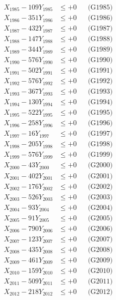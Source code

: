 \documentclass[a4paper,10pt]{article}
\begin{document}
{\begin{align}
X_{1985} - 109Y_{1985} &\leq +0 && \text{(G1985)} \\
X_{1986} - 351Y_{1986} &\leq +0 && \text{(G1986)} \\
X_{1987} - 432Y_{1987} &\leq +0 && \text{(G1987)} \\
X_{1988} - 147Y_{1988} &\leq +0 && \text{(G1988)} \\
X_{1989} - 344Y_{1989} &\leq +0 && \text{(G1989)} \\
X_{1990} - 576Y_{1990} &\leq +0 && \text{(G1990)} \\
\allowbreak
X_{1991} - 502Y_{1991} &\leq +0 && \text{(G1991)} \\
X_{1992} - 576Y_{1992} &\leq +0 && \text{(G1992)} \\
X_{1993} - 367Y_{1993} &\leq +0 && \text{(G1993)} \\
X_{1994} - 130Y_{1994} &\leq +0 && \text{(G1994)} \\
X_{1995} - 522Y_{1995} &\leq +0 && \text{(G1995)} \\
X_{1996} - 258Y_{1996} &\leq +0 && \text{(G1996)} \\
X_{1997} - 16Y_{1997} &\leq +0 && \text{(G1997)} \\
X_{1998} - 205Y_{1998} &\leq +0 && \text{(G1998)} \\
X_{1999} - 576Y_{1999} &\leq +0 && \text{(G1999)} \\
X_{2000} - 43Y_{2000} &\leq +0 && \text{(G2000)} \\
\allowbreak
X_{2001} - 402Y_{2001} &\leq +0 && \text{(G2001)} \\
X_{2002} - 176Y_{2002} &\leq +0 && \text{(G2002)} \\
X_{2003} - 526Y_{2003} &\leq +0 && \text{(G2003)} \\
X_{2004} - 93Y_{2004} &\leq +0 && \text{(G2004)} \\
X_{2005} - 91Y_{2005} &\leq +0 && \text{(G2005)} \\
X_{2006} - 790Y_{2006} &\leq +0 && \text{(G2006)} \\
X_{2007} - 123Y_{2007} &\leq +0 && \text{(G2007)} \\
X_{2008} - 435Y_{2008} &\leq +0 && \text{(G2008)} \\
X_{2009} - 461Y_{2009} &\leq +0 && \text{(G2009)} \\
X_{2010} - 159Y_{2010} &\leq +0 && \text{(G2010)} \\
\allowbreak
X_{2011} - 509Y_{2011} &\leq +0 && \text{(G2011)} \\
X_{2012} - 218Y_{2012} &\leq +0 && \text{(G2012)} \\

\end{align}}
\end{document}
